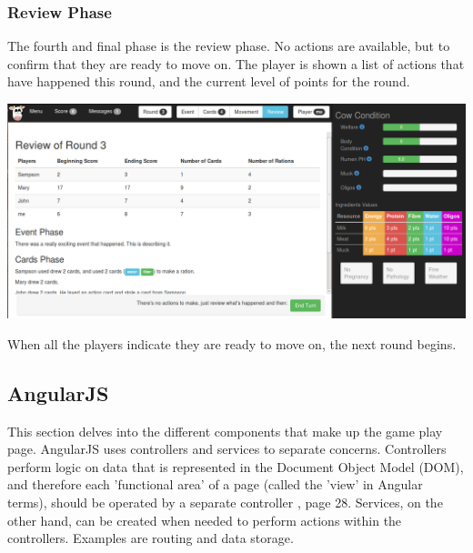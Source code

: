 \subsubsection{Review Phase}
The fourth and final phase is the review phase. No actions are available, but to confirm that they are ready to move on. The player is shown a list of actions that have happened this round, and the current level of points for the round.
\begin{center}
	\includegraphics[width=\textwidth]{Images/app3/ui-phase-review}
\end{center}

When all the players indicate they are ready to move on, the next round begins.

\subsection{AngularJS}
This section delves into the different components that make up the game play page. AngularJS uses controllers and services to separate concerns. Controllers perform logic on data that is represented in the Document Object Model (DOM), and therefore each 'functional area' of a page (called the 'view' in Angular terms), should be operated by a separate controller \cite{AngularBook}, page 28. Services, on the other hand, can be created when needed to perform actions within the controllers. Examples are routing and data storage.

